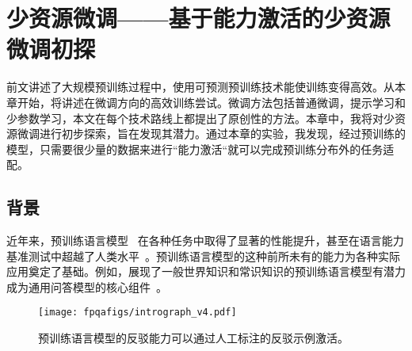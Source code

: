 \chapter{少资源微调——基于能力激活的少资源微调初探}

前文讲述了大规模预训练过程中，使用可预测预训练技术能使训练变得高效。从本章开始，将讲述在微调方向的高效训练尝试。微调方法包括普通微调，提示学习和少参数学习，本文在每个技术路线上都提出了原创性的方法。本章中，我将对少资源微调进行初步探索，旨在发现其潜力。通过本章的实验，我发现，经过预训练的模型，只需要很少量的数据来进行“能力激活“就可以完成预训练分布外的任务适配。




\section{背景}
近年来，预训练语言模型~\cite{lewis-etal-2020-bart, han2021pretrained, raffel2020exploring, brown2020language} 在各种任务中取得了显著的性能提升，甚至在语言能力基准测试中超越了人类水平~\cite{wang-etal-2018-glue, wang2019superglue,srivastava2022beyond}。预训练语言模型的这种前所未有的能力为各种实际应用奠定了基础。例如，展现了一般世界知识和常识知识的预训练语言模型有潜力成为通用问答模型的核心组件~\cite{tafjord2021general,guu2020retrieval}。

\begin{figure}[!htpb]
    \centering
    \texttt{[image: fpqafigs/intrograph\_v4.pdf]}
    \caption{预训练语言模型的反驳能力可以通过人工标注的反驳示例激活。}
    \label{fig:intrograph}
\end{figure}

\begin{table}[]
    \centering
    \caption{一些先前的研究报告了预训练语言模型在面对具有误导性问题时的脆弱性。本文提供了更多示例，详见表格~\ref{tab:direct_answer_examples_main}。}
    \label{tab:intro_example}
\end{table}

